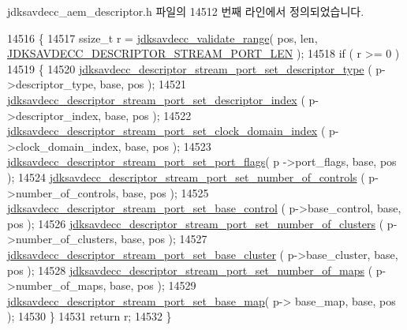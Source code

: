 jdksavdecc\+\_\+aem\+\_\+descriptor.\+h 파일의 14512 번째 라인에서 정의되었습니다.


\begin{DoxyCode}
14516 \{
14517     ssize\_t r = \hyperlink{group__util_ga9c02bdfe76c69163647c3196db7a73a1}{jdksavdecc\_validate\_range}( pos, len, 
      \hyperlink{group__descriptor__stream__port_ga1b3e49096f01beb5bfac0e22093adc0b}{JDKSAVDECC\_DESCRIPTOR\_STREAM\_PORT\_LEN} );
14518     \textcolor{keywordflow}{if} ( r >= 0 )
14519     \{
14520         \hyperlink{group__descriptor__stream__port_gade217c4ccbb178f0c8c3e585c905e6ee}{jdksavdecc\_descriptor\_stream\_port\_set\_descriptor\_type}
      ( p->descriptor\_type, base, pos );
14521         \hyperlink{group__descriptor__stream__port_gaea8ba85a6935bce53a5ff07e80b791df}{jdksavdecc\_descriptor\_stream\_port\_set\_descriptor\_index}
      ( p->descriptor\_index, base, pos );
14522         \hyperlink{group__descriptor__stream__port_ga659743d80bd5791634f294b4b6e9d2fa}{jdksavdecc\_descriptor\_stream\_port\_set\_clock\_domain\_index}
      ( p->clock\_domain\_index, base, pos );
14523         \hyperlink{group__descriptor__stream__port_ga3b8b89a65df17ad7ee9a206b372dd767}{jdksavdecc\_descriptor\_stream\_port\_set\_port\_flags}( p
      ->port\_flags, base, pos );
14524         \hyperlink{group__descriptor__stream__port_ga2f4b1d2229b6f1df9536517812d05a3f}{jdksavdecc\_descriptor\_stream\_port\_set\_number\_of\_controls}
      ( p->number\_of\_controls, base, pos );
14525         \hyperlink{group__descriptor__stream__port_ga30717d11d426fe9e654e79db9507dff0}{jdksavdecc\_descriptor\_stream\_port\_set\_base\_control}
      ( p->base\_control, base, pos );
14526         \hyperlink{group__descriptor__stream__port_ga1a78e28b5b54e197fceaa0c78c3a15b8}{jdksavdecc\_descriptor\_stream\_port\_set\_number\_of\_clusters}
      ( p->number\_of\_clusters, base, pos );
14527         \hyperlink{group__descriptor__stream__port_gae89f646edcaebd56089db2efb1a051e1}{jdksavdecc\_descriptor\_stream\_port\_set\_base\_cluster}
      ( p->base\_cluster, base, pos );
14528         \hyperlink{group__descriptor__stream__port_gac5bac21e6bf791df532f85f2ed3eaa6f}{jdksavdecc\_descriptor\_stream\_port\_set\_number\_of\_maps}
      ( p->number\_of\_maps, base, pos );
14529         \hyperlink{group__descriptor__stream__port_gacd3176cf921b5df3231ce0390b231465}{jdksavdecc\_descriptor\_stream\_port\_set\_base\_map}( p->
      base\_map, base, pos );
14530     \}
14531     \textcolor{keywordflow}{return} r;
14532 \}
\end{DoxyCode}



